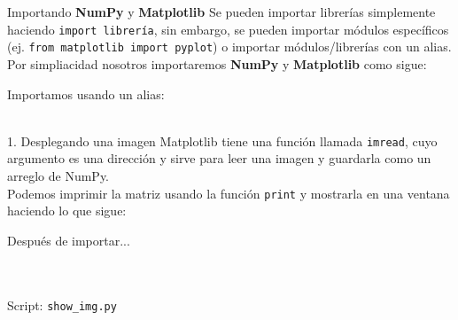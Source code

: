 \documentclass[usenames,dvipsnames]{beamer}
\begin{document}
  \begin{frame}{Importando \textbf{NumPy} y \textbf{Matplotlib}}
    Se pueden importar librerías simplemente haciendo \texttt{import librería},
    sin embargo, se pueden importar módulos específicos (ej. \texttt{from
    matplotlib import pyplot}) o importar módulos/librerías con un alias.\\
    \vspace*{0.3cm}
    Por simpliacidad nosotros importaremos \textbf{NumPy} y \textbf{Matplotlib}
    como sigue:
    \vspace*{0.3cm}
    \begin{block}{Importamos usando un alias:}
      \\
      \\
      \vspace*{0.5cm}
    \end{block}
  \end{frame}

  \begin{frame}{1. Desplegando una imagen}
    Matplotlib tiene una función llamada \texttt{imread}, cuyo argumento es una
    dirección y sirve para leer una imagen y guardarla como un arreglo de NumPy.\\
    \vspace*{0.3cm}
    Podemos imprimir la matriz usando la función \texttt{print} y mostrarla en
    una ventana haciendo lo que sigue:
    \vspace*{0.3cm}
    \begin{block}{Después de importar...}
      \\
      \\
      \\
      \vspace*{0.5cm}
    \end{block}
    Script: \texttt{show\_img.py}
  \end{frame}
\end{document}
